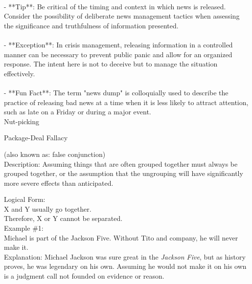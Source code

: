 \documentclass[a4paper,12pt,single,pdftex]{scrartcl}
\begin{document}
    
      
    \\

    
      - **Tip**: Be critical of the timing and context in which news is released. Consider the possibility of deliberate news management tactics when assessing the significance and truthfulness of information presented.
    \\

    
      
    \\

    
      - **Exception**: In crisis management, releasing information in a controlled manner can be necessary to prevent public panic and allow for an organized response. The intent here is not to deceive but to manage the situation effectively.
    \\

    
      
    \\

    
      - **Fun Fact**: The term "news dump" is colloquially used to describe the practice of releasing bad news at a time when it is less likely to attract attention, such as late on a Friday or during a major event.
    \\

  

Nut-picking

Package-Deal Fallacy
    
      (also known as: false conjunction)
    \\

  
    Description: Assuming things that are often grouped together must always be grouped together, or the assumption that the ungrouping will have significantly more severe effects than anticipated.

    
      Logical Form:
    \\

    
      X and Y usually go together.
    \\

    
      Therefore, X or Y cannot be separated.
    \\

    
      Example \#1:
    \\

    
      Michael is part of the Jackson Five.  Without Tito and company, he will never make it.
    \\

    
      Explanation: Michael Jackson was sure great in the {\it Jackson Five}, but as history proves, he was legendary on his own.  Assuming he would not make it on his own is a judgment call not founded on evidence or reason.
    \\
\end{document}
